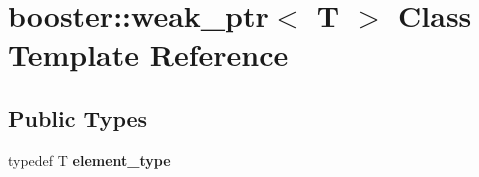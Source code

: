 \section{booster\-:\-:weak\-\_\-ptr$<$ \-T $>$ \-Class \-Template \-Reference}
\label{classbooster_1_1weak__ptr}
\subsection*{\-Public \-Types}
\begin{DoxyCompactItemize}
\item 
typedef \-T {\bfseries element\-\_\-type}\label{classbooster_1_1weak__ptr_a07c8444ff0fcb1e509436c32728e6268}

\end{DoxyCompactItemize}
